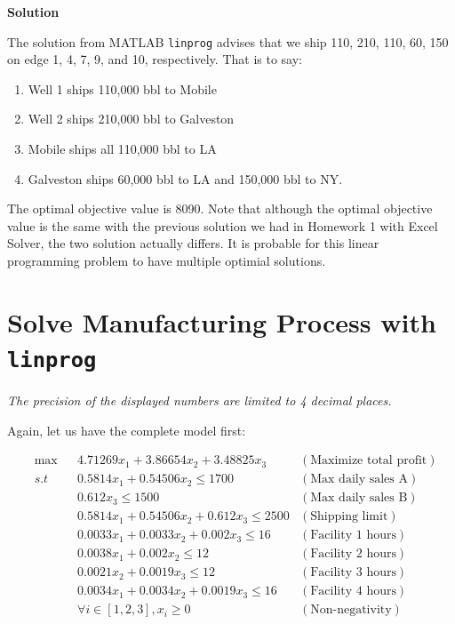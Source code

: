 \textbf{Solution}\par
The solution from MATLAB \texttt{linprog} advises that we ship 110, 210, 110, 60, 150 on edge 1, 4, 7, 9, and 10, respectively. That is to say: 
\begin{enumerate}
    \item Well 1 ships 110,000 bbl to Mobile
    \item Well 2 ships 210,000 bbl to Galveston
    \item Mobile ships all 110,000 bbl to LA
    \item Galveston ships 60,000 bbl to LA and 150,000 bbl to NY.
\end{enumerate}
The optimal objective value is 8090. Note that although the optimal objective value is the same with the previous solution we had in Homework 1 with Excel Solver, the two solution actually differs. It is probable for this linear programming problem to have multiple optimial solutions. 

\section{Solve Manufacturing Process with \texttt{linprog}}

\textit{The precision of the displayed numbers are limited to 4 decimal places.}

Again, let us have the complete model first:

\begin{align*}
&\max && 4.71269x_1 + 3.86654x_2 + 3.48825x_3 & (\text{Maximize total profit})\\
&s.t
 && 0.5814x_1 + 0.54506x_2 \leq 1700 & (\text{Max daily sales A}) \\
&&& 0.612x_3 \leq 1500 & (\text{Max daily sales B}) \\
&&& 0.5814x_1 + 0.54506x_2 + 0.612x_3 \leq 2500 & (\text{Shipping limit}) \\
&&& 0.0033x_1 + 0.0033x_2 + 0.002x_3 \leq 16 & (\text{Facility 1 hours}) \\
&&& 0.0038x_1 + 0.002x_2 \leq 12 & (\text{Facility 2 hours}) \\
&&& 0.0021x_2 + 0.0019x_3 \leq 12 & (\text{Facility 3 hours}) \\
&&& 0.0034x_1 + 0.0034x_2 + 0.0019x_3 \leq 16 & (\text{Facility 4 hours}) \\
&&& \forall i \in [1,2,3], x_i \geq 0 & (\text{Non-negativity}) \\
\end{align*}

